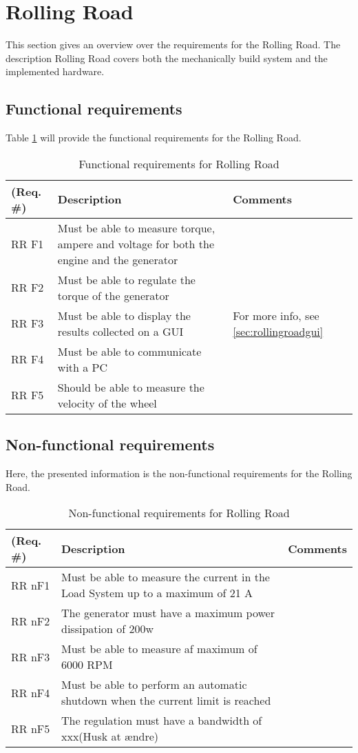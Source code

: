 \section{Rolling Road}
This section gives an overview over the requirements for the Rolling Road. The description Rolling Road covers both the mechanically build system and the implemented hardware. 

\subsection{Functional requirements}
Table \ref{Functional:Rolling Road} will provide the functional requirements for the Rolling Road.

\begin{table}[h!]
	\centering
	\begin{tabular}{|p{2 cm}|p{4 cm}|p{3 cm}|}
	\hline
	\textbf{(Req. \#)} & \textbf{Description} & \textbf{Comments} \\\hline
	RR F1	& Must be able to measure torque, ampere and voltage for both the engine and the generator  &   \\\hline
	RR F2	& Must be able to regulate the torque of the generator &   \\\hline
	RR F3	& Must be able to display the results collected on a GUI & For more info, see \ref{sec:rollingroadgui}  \\\hline
	RR F4	& Must be able to communicate with a PC &   \\\hline
	RR F5	& Should be able to measure the velocity of the wheel &   \\\hline
	\end{tabular}
	\label{Functional:Rolling Road}
	\caption{Functional requirements for Rolling Road}
\end{table}

\subsection{Non-functional requirements}
Here, the presented information is the non-functional requirements for the Rolling Road.

\begin{table}[h!]
	\centering
	\begin{tabular}{|p{2 cm}|p{4 cm}|p{3 cm}|}
		\hline
		\textbf{(Req. \#)} & \textbf{Description} & \textbf{Comments} \\\hline
		RR nF1	& Must be able to measure the current in the Load System up to a maximum of 21 A  &   \\\hline
		RR nF2	& The generator must have a maximum power dissipation of 200w &   \\\hline
		RR nF3	& Must be able to measure af maximum of 6000 RPM &   \\\hline
		RR nF4	& Must be able to perform an automatic shutdown when the current limit is reached &   \\\hline
		RR nF5	& The regulation must have a bandwidth of xxx\fxnote(Husk at ændre) &   \\\hline
	\end{tabular}
	\label{Nonfunctional:RollingRoad}
	\caption{Non-functional requirements for Rolling Road}
\end{table}